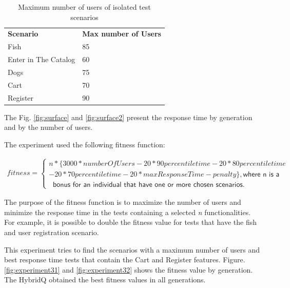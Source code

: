 \documentclass{bmcart}
\begin{document}
\begin{table}[h!]
\centering
\caption{Maximum number of users of isolated test scenarios }
\label{tab:isolated}
\begin{tabular}{ll}
\rowcolor[HTML]{FFCCC9} 
\textbf{Scenario}    & \textbf{Max number of Users} \\
Fish                 & 85                           \\
Enter in The Catalog & 60                           \\
Dogs                 & 75                           \\
Cart                 & 70                           \\
Register             & 90                          
\end{tabular}
\end{table}

The Fig. \ref{fig:surface} and \ref{fig:surface2} present the response time by generation and by the number of users.



The experiment used the following fitness function:

\begin{equation}
\begin{aligned}
fitness=\begin{cases} n*\{3000*numberOfUsers-20* 90percentiletime-20*80percentiletime\\-20*70percentiletime
-20*maxResponseTime-penalty\} , \textsf{where n is a }\\\ \textsf{ bonus for an individual that have one or more chosen scenarios.} 
\end{cases}
\end{aligned}
\end{equation}


The purpose of the fitness function is to maximize the number of users and minimize the response time in the tests containing a selected \textit{n} functionalities. For example, it is possible to double the fitness value for tests that have the fish and user registration scenario. 

This experiment tries to find the scenarios with a maximum number of users and best response time tests that contain the Cart and Register features. Figure. \ref{fig:experiment31} and \ref{fig:experiment32} shows the fitness value by generation. The HybridQ obtained the best fitness values in all generations.
\end{document}
